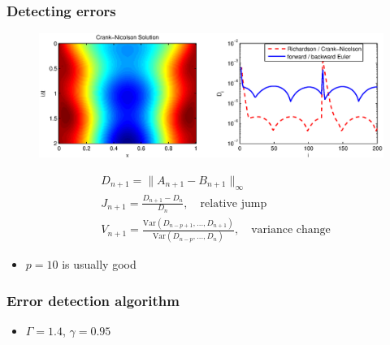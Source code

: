 \documentclass{beamer}
\begin{document}
\begin{frame}
\frametitle{Detecting errors}

\begin{figure}
  \centering
  \includegraphics[scale=0.5]{figs/heat_soln_diffs1.eps}
  \vspace{-1cm}
\end{figure}


\begin{align}
& D_{n+1} = \| A_{n+1} - B_{n+1} \|_{\infty} \nonumber \\
& J_{n+1} = \frac{D_{n+1} - D_n}{D_n}, \quad \text{relative jump} \nonumber \\
& V_{n+1} = \frac{\text{Var}(D_{n-p+1}, \ldots, D_{n+1})}{\text{Var}(D_{n-p}, \ldots, D_{n})}, \quad \text{variance change} \nonumber
\end{align}

\begin{itemize}
\item $p = 10$ is usually good
\end{itemize}


\end{frame}

\begin{frame}
  \frametitle{Error detection algorithm}
  

  \begin{algorithm}[H]
  \end{algorithm}
  
  \vspace{0.5cm}
  
  \begin{itemize}
    \item $\Gamma = 1.4$, $\gamma = 0.95$
  \end{itemize}
\end{frame}   
\end{document}

